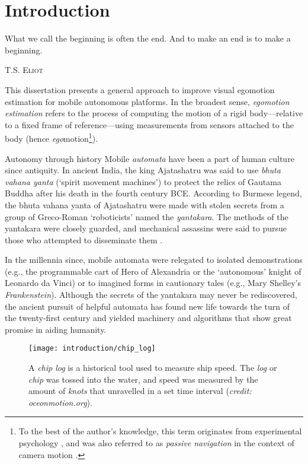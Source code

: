 \chapter{Introduction}
\label{ch:intro}
\epigraph{What we call the beginning is often the end. And to make an end is to make a beginning.}{\textsc{T.S. Eliot}}
\vspace{3em}

This dissertation presents a general approach to improve visual egomotion estimation for mobile autonomous platforms.  In the broadest sense, \textit{egomotion estimation} refers to the process of computing the motion of a rigid body---relative to a fixed frame of reference---using measurements from sensors attached to the body (hence \textit{ego}motion\footnote{To the best of the author's knowledge, this term originates from experimental psychology \citep{warren1976perception}, and was also referred to as \textit{passive navigation} in the context of camera motion \citep{bruss_passive_1983}.}).  
\begin{remark}{Autonomy through history}
Mobile \textit{automata} have been a part of human culture since antiquity. In ancient India, the king Ajatashatru was said to use \textit{bhuta vahana yanta} (`spirit movement machines') to protect the relics of Gautama Buddha after his death in the fourth century BCE. According to Burmese legend, the bhuta vahana yanta of Ajatashatru were made with stolen secrets from a group of Greco-Roman `roboticists' named the \textit{yantakara}. The methods of the yantakara were closely guarded, and mechanical assassins were said to pursue those who attempted to disseminate them \citep{MayorGodsRobots2019}.

In the millennia since, mobile automata were relegated to isolated demonstrations (e.g., the programmable cart of Hero of Alexandria or the `autonomous' knight of Leonardo da Vinci) or to imagined forms in cautionary tales (e.g., Mary Shelley's \textit{Frankenstein}). Although the secrets of the yantakara may never be rediscovered, the ancient pursuit of helpful automata has found new life towards the turn of the twenty-first century and yielded machinery and algorithms that show great promise in aiding humanity.
\end{remark}
\newpage
 
 \begin{wrapfigure}{r}{0.48\textwidth}
	\centering
	\texttt{[image: introduction/chip\_log]}
	\caption{A \textit{chip log} is a historical tool used to measure ship speed. The \textit{log} or \textit{chip} was tossed into the water, and speed was measured by the amount of \textit{knots} that unravelled in a set time interval (\textit{credit: oceonmotion.org}).}
	\label{fig:intro_chip_log}
\end{wrapfigure}

